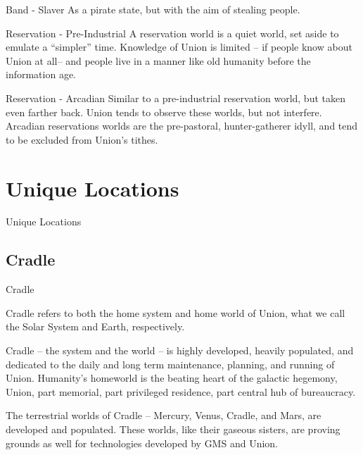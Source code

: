              Band  - Slaver                       As a pirate state, but with the aim of stealing people.  

             Reservation -  Pre-Industrial        A reservation world is a quiet world, set aside to  
                                                  emulate a “simpler” time. Knowledge of Union is  
                                                  limited -- if people know about Union at all--  and  
                                                  people live in a manner like old humanity before the  
                                                  information age.  

             Reservation - Arcadian               Similar to a pre-industrial reservation world, but taken  
                                                  even farther back. Union tends to observe these  
                                                  worlds, but not interfere. Arcadian reservations worlds  
                                                  are the pre-pastoral, hunter-gatherer idyll, and tend to  
                                                  be excluded from Union’s tithes.  


\section{Unique Locations}
Unique Locations   
\subsection{Cradle}
Cradle  

                                                                                                                  


Cradle refers to both the home system and home world of Union, what we call the Solar System  
and Earth, respectively. 
 

Cradle -- the system and the world -- is highly developed, heavily populated, and dedicated to  
the daily and long term maintenance, planning, and running of Union. Humanity's homeworld is  
the beating heart of the galactic hegemony, Union, part memorial, part privileged residence, part  
central hub of bureaucracy. 
 

The terrestrial worlds of Cradle -- Mercury, Venus, Cradle, and Mars, are developed and  
populated. These worlds, like their gaseous sisters, are proving grounds as well for technologies  
developed by GMS and Union. 
 

